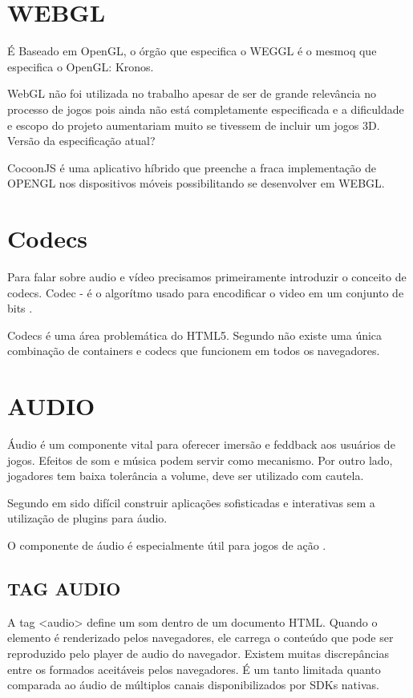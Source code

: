 \documentclass[
12pt,
a4paper,
portuges,
draft
]{report}
\begin{document}
\section{WEBGL}
É Baseado em OpenGL, o órgão que especifica o WEGGL é o mesmoq que especifica o OpenGL: Kronos.

WebGL não foi utilizada no trabalho apesar de ser de grande
relevância no processo de jogos pois ainda não está completamente
especificada e a dificuldade e escopo do projeto aumentariam muito se
tivessem de incluir um jogos 3D. Versão da especificação atual?

CocoonJS é uma aplicativo híbrido que preenche a fraca implementação
de OPENGL nos dispositivos móveis possibilitando se desenvolver em
WEBGL.

\section{Codecs}
Para falar sobre audio e vídeo precisamos primeiramente introduzir o conceito de codecs. Codec - é o algorítmo usado para encodificar o video em um conjunto de bits \cite{diveIntohtml}.

Codecs é uma área problemática do HTML5. Segundo \cite{diveIntohtml} não existe uma única combinação de containers e codecs que funcionem em todos os navegadores.


\section{AUDIO}
Áudio é um componente vital para oferecer imersão e feddback aos
usuários de jogos. Efeitos de som e música podem servir como mecanismo. 
Por outro lado, jogadores tem baixa tolerância a volume, deve ser utilizado com cautela.

Segundo \cite{browserGamesTechnologyAndFuture} em sido difícil construir aplicações sofisticadas e interativas sem a utilização de plugins para áudio.

O componente de áudio é especialmente útil para jogos de ação \autocite{browserGamesTechnologyAndFuture}.

\subsection{TAG AUDIO}

A tag <audio> define um som dentro de um documento HTML. Quando o
elemento é renderizado pelos navegadores, ele carrega o conteúdo
que pode ser reproduzido pelo player de audio do navegador. Existem
muitas discrepâncias entre os formados aceitáveis pelos navegadores.
É um tanto limitada quanto comparada ao áudio de múltiplos canais
disponibilizados por SDKs nativas.
\end{document}
